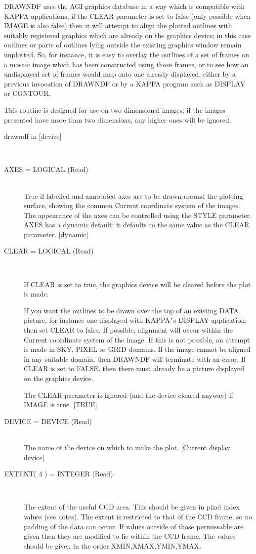 \documentclass[twoside,11pt]{article}
\newcommand{\htmlref}[2]{#1}
\newcommand{\xref}[3]{#1}
\renewcommand{\_}{\texttt{\symbol{95}}}
\newcommand{\routine}[1]{{\sc #1}}
\newcommand{\xroutine}[1]{\htmlref{{\sc #1}}{#1}}
\newcommand{\sstusage}[1]{\item[Usage:] \mbox{}
   \begin{description}
      {\ssttt \item #1}
   \end{description}
}
\newcommand{\sstparameters}[1]{
   \item[Parameters:] \mbox{} \\
   \vspace{-3.5ex}
   \begin{description}
      #1
   \end{description}
}
\newcommand{\sstsubsection}[1]{ \item[{#1}] \mbox{} \\}
\newcommand{\sstusage}[1]{\item[Usage:]
      \begin{description}
         {\ssttt #1}
      \end{description}
      \\
   }
\newcommand{\sstparameters}[1]{
      \item[Parameters:] \\
      \begin{description}
         #1
      \end{description}
      \\
   }
\newcommand{\sstsubsection}[1]{\item[{#1}]}
\begin{document}
{{      \xroutine{DRAWNDF} uses the \xref{AGI graphics database}{sun95}{se_agitate} in a way which is
      compatible with \xref{KAPPA}{sun95}{} applications; if the CLEAR parameter is
      set to false (only possible when IMAGE is also false) then it
      will attempt to align the plotted outlines with suitably
      registered graphics which are already on the graphics
      device; in this case outlines or parts of outlines lying
      outside the existing graphics window remain unplotted.
      So, for instance, it is easy to overlay the outlines
      of a set of frames on a mosaic image which has been constructed
      using those frames, or to see how an undisplayed set of frames
      would map onto one already displayed, either by a previous
      invocation of \routine{DRAWNDF} or by a KAPPA
      program such as \xref{DISPLAY}{sun95}{DISPLAY}
      or \xref{CONTOUR}{sun95}{CONTOUR}.

      This routine is designed for use on two-dimensional images;
      if the images presented have more than two dimensions, any higher
      ones will be ignored.
   }
   \sstusage{
      drawndf in [device]
   }
   \sstparameters{
      \sstsubsection{
         AXES = \_LOGICAL (Read)
      }{
         True if labelled and annotated axes are to be drawn around the
         plotting surface, showing the common Current coordinate system
         of the images.  The appearance of the axes can be controlled
         using the STYLE parameter.  AXES has a dynamic default; it
         defaults to the same value as the CLEAR parameter.
         [dynamic]
      }
      \sstsubsection{
         CLEAR = \_LOGICAL (Read)
      }{
         If CLEAR is set to true, the graphics device will be cleared
         before the plot is made.

         If you want the outlines to be drawn over the top
         of an existing DATA picture, for instance one displayed with
         KAPPA{\tt '}s \xref{DISPLAY}{sun95}{DISPLAY} application, then set CLEAR to false.  If
         possible, alignment will occur within the Current coordinate
         system of the image.  If this is not possible, an attempt is
         made in SKY, PIXEL or GRID domains.  If the image cannot be
         aligned in any suitable domain, then \routine{DRAWNDF} will terminate
         with an error.  If CLEAR is set to FALSE, then there must
         already be a picture displayed on the graphics device.

         The CLEAR parameter is ignored (and the device cleared anyway)
         if IMAGE is true.
         [TRUE]
      }
      \sstsubsection{
         DEVICE = DEVICE (Read)
      }{
         The name of the device on which to make the plot.
         [Current display device]
      }
      \sstsubsection{
         EXTENT( 4 ) = \_INTEGER (Read)
      }{
         The extent of the useful CCD area.  This should be given in
         pixel index values (see notes). The extent is restricted to
         that of the CCD frame, so no padding of the data can occur. If
         values outside of those permissable are given then they are
         modified to lie within the CCD frame. The values should be
         given in the order XMIN,XMAX,YMIN,YMAX.

}}}
\end{document}
